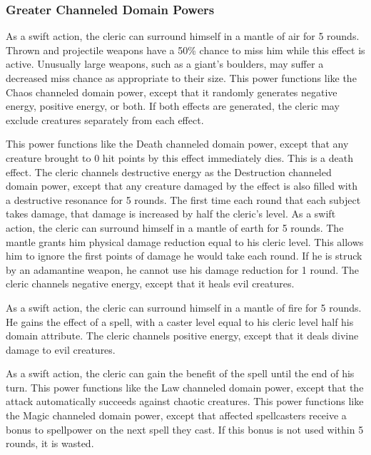\subsubsection{Greater Channeled Domain Powers}\label{Greater Channeled Domain Powers}

As a swift action, the cleric can surround himself in a mantle of air for 5 rounds.
Thrown and projectile weapons have a 50\% chance to miss him while this effect is active.
Unusually large weapons, such as a giant's boulders, may suffer a decreased miss chance as appropriate to their size.
This power functions like the Chaos channeled domain power, except that it randomly generates negative energy, positive energy, or both.
If both effects are generated, the cleric may exclude creatures separately from each effect.

This power functions like the Death channeled domain power, except that any creature brought to 0 hit points by this effect immediately dies.
This is a death effect.
The cleric channels destructive energy as the Destruction channeled domain power, except that any creature damaged by the effect is also filled with a destructive resonance for 5 rounds.
The first time each round that each subject takes damage, that damage is increased by half the cleric's level.
As a swift action, the cleric can surround himself in a mantle of earth for 5 rounds.
The mantle grants him physical damage reduction equal to his cleric level.
This allows him to ignore the first points of damage he would take each round.
If he is struck by an adamantine weapon, he cannot use his damage reduction for 1 round.
The cleric channels negative energy, except that it heals evil creatures.

As a swift action, the cleric can surround himself in a mantle of fire for 5 rounds.
He gains the effect of a  spell, with a caster level equal to his cleric level \add half his domain attribute.
The cleric channels positive energy, except that it deals divine damage to evil creatures.

 As a swift action, the cleric can gain the benefit of the 
spell until the end of his turn.
This power functions like the Law channeled domain power, except that the attack automatically succeeds against chaotic creatures.
This power functions like the Magic channeled domain power, except that affected spellcasters receive a  bonus to spellpower on the next spell they cast.
If this bonus is not used within 5 rounds, it is wasted.

